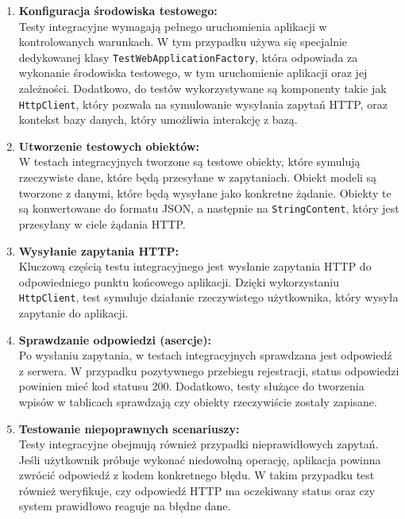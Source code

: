 \documentclass[twoside]{projektInzynierskiMS1}
\begin{document}
\begin{enumerate}
    \item \textbf{Konfiguracja środowiska testowego:}\\
    Testy integracyjne wymagają pełnego uruchomienia aplikacji w kontrolowanych warunkach. W tym przypadku używa się specjalnie dedykowanej klasy \texttt{TestWebApplicationFactory}, która odpowiada za wykonanie środowiska testowego, w tym uruchomienie aplikacji oraz jej zależności. Dodatkowo, do testów wykorzystywane są komponenty takie jak \texttt{HttpClient}, który pozwala na symulowanie wysyłania zapytań HTTP, oraz kontekst bazy danych, który umożliwia interakcję z bazą.

    \item \textbf{Utworzenie testowych obiektów:}\\
    W testach integracyjnych tworzone są testowe obiekty, które symulują rzeczywiste dane, które będą przesyłane w zapytaniach. Obiekt modeli są tworzone z danymi, które będą wysyłane jako konkretne żądanie. Obiekty te są konwertowane do formatu JSON, a następnie na \texttt{StringContent}, który jest przesyłany w ciele żądania HTTP.

    \item \textbf{Wysyłanie zapytania HTTP:}\\
    Kluczową częścią testu integracyjnego jest wysłanie zapytania HTTP do odpowiedniego punktu końcowego aplikacji. Dzięki wykorzystaniu \texttt{HttpClient}, test symuluje działanie rzeczywistego użytkownika, który wysyła zapytanie do aplikacji.

    \item \textbf{Sprawdzanie odpowiedzi (asercje):}\\
    Po wysłaniu zapytania, w testach integracyjnych sprawdzana jest odpowiedź z serwera. W przypadku pozytywnego przebiegu rejestracji, status odpowiedzi powinien mieć kod statusu 200. Dodatkowo, testy służące do tworzenia wpisów w tablicach sprawdzają czy obiekty rzeczywiście zostały zapisane.

    \item \textbf{Testowanie niepoprawnych scenariuszy:}\\
    Testy integracyjne obejmują również przypadki nieprawidłowych zapytań. Jeśli użytkownik próbuje wykonać niedowolną operację, aplikacja powinna zwrócić odpowiedź z kodem konkretnego błędu. W takim przypadku test również weryfikuje, czy odpowiedź HTTP ma oczekiwany status oraz czy system prawidłowo reaguje na błędne dane.

\end{enumerate}
\end{document}
